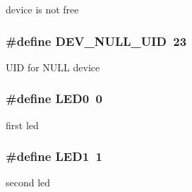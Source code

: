 device is not free \hypertarget{group___a_p7000___d_e_v_g9f048df36bf3e7d560e5f81114a11ec0}{
\subsubsection[{DEV\_\-NULL\_\-UID}]{\setlength{\rightskip}{0pt plus 5cm}\#define DEV\_\-NULL\_\-UID~23}}
\label{group___a_p7000___d_e_v_g9f048df36bf3e7d560e5f81114a11ec0}


UID for NULL device \hypertarget{group___a_p7000___d_e_v_ge8d5b4e7e2d9d21caaa4744d385d7cc7}{
\subsubsection[{LED0}]{\setlength{\rightskip}{0pt plus 5cm}\#define LED0~0}}
\label{group___a_p7000___d_e_v_ge8d5b4e7e2d9d21caaa4744d385d7cc7}


first led \hypertarget{group___a_p7000___d_e_v_g8aa85ae9867fabf70ec72cd3bf6fb6b9}{
\subsubsection[{LED1}]{\setlength{\rightskip}{0pt plus 5cm}\#define LED1~1}}
\label{group___a_p7000___d_e_v_g8aa85ae9867fabf70ec72cd3bf6fb6b9}


second led 